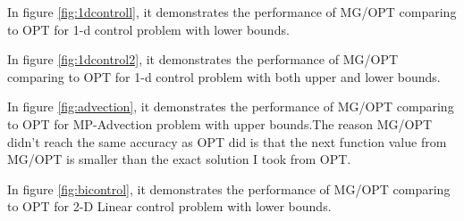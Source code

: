 \documentclass[10pt]{article}
\begin{document}
\begin{itemize}
In figure \ref{fig:1dcontroll}, it demonstrates the performance of MG/OPT comparing to OPT for 1-d control problem with lower bounds.\

In figure \ref{fig:1dcontrol2}, it demonstrates the performance of MG/OPT comparing to OPT for 1-d control problem with both upper and lower bounds.\

In figure \ref{fig:advection}, it demonstrates the performance of MG/OPT comparing to OPT for MP-Advection problem  with upper bounds.The reason MG/OPT didn't reach the same accuracy as OPT did is that the next function value from MG/OPT is smaller than the exact solution I took from OPT.\

In figure \ref{fig:bicontrol}, it demonstrates the performance of MG/OPT comparing to OPT for 2-D Linear control problem  with lower bounds. 
\end{itemize}
\end{document}
